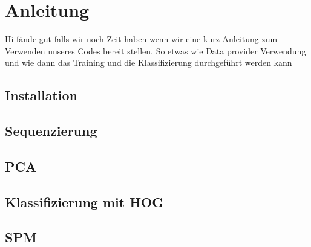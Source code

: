 \section*{Anleitung}

Hi fände gut falls wir noch Zeit haben wenn wir eine kurz Anleitung zum Verwenden unseres Codes bereit stellen.
So etwas wie Data provider Verwendung und wie dann das Training und die Klassifizierung durchgeführt werden kann 
\subsection*{Installation}
\subsection*{Sequenzierung}
\subsection*{PCA}
\subsection*{Klassifizierung mit HOG}
\subsection*{SPM}




